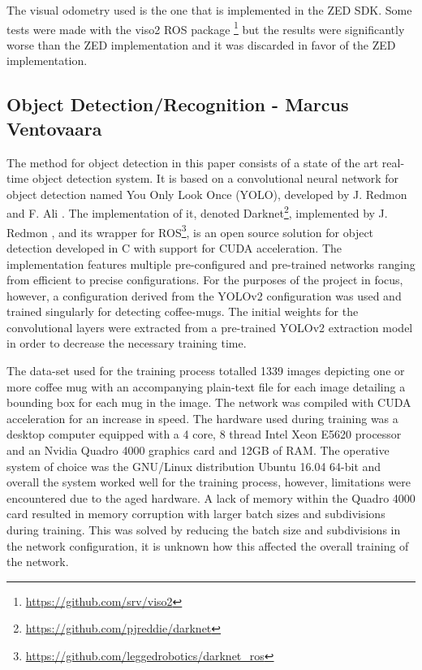 The visual odometry used is the one that is implemented in the ZED SDK. Some tests were made with the viso2 ROS package \footnote{\url{https://github.com/srv/viso2}} but the results were significantly worse than the ZED implementation and it was discarded in favor of the ZED implementation. 

\subsection{Object Detection/Recognition - Marcus Ventovaara}
The method for object detection in this paper consists of a state of the art real-time object detection system. It is based on a convolutional neural network for object detection named You Only Look Once (YOLO), developed by J. Redmon and F. Ali \cite{redmon2016yolo9000}. The implementation of it, denoted Darknet\footnote{\url{https://github.com/pjreddie/darknet}}, implemented by J. Redmon \cite{darknet13}, and its wrapper for ROS\footnote{\url{https://github.com/leggedrobotics/darknet_ros}}, is an open source solution for object detection developed in C with support for CUDA acceleration. The implementation features multiple pre-configured and pre-trained networks ranging from efficient to precise configurations. For the purposes of the project in focus, however, a configuration derived from the YOLOv2 configuration was used and trained singularly for detecting coffee-mugs. The initial weights for the convolutional layers were extracted from a pre-trained YOLOv2 extraction model in order to decrease the necessary training time.

The data-set used for the training process totalled 1339 images depicting one or more coffee mug with an accompanying plain-text file for each image detailing a bounding box for each mug in the image. The network was compiled with CUDA acceleration for an increase in speed. The hardware used during training was a desktop computer equipped with a 4 core, 8 thread Intel Xeon E5620 processor and an Nvidia Quadro 4000 graphics card and 12GB of RAM. The operative system of choice was the GNU/Linux distribution Ubuntu 16.04 64-bit and overall the system worked well for the training process, however, limitations were encountered due to the aged hardware. A lack of memory within the Quadro 4000 card resulted in memory corruption with larger batch sizes and subdivisions during training. This was solved by reducing the batch size and subdivisions in the network configuration, it is unknown how this affected the overall training of the network.

